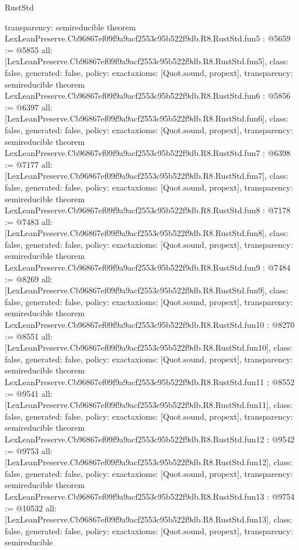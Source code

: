 \begin{lexlean}{RustStd}
\begin{coremodule}
{  transparency: semireducible
}
theorem LexLeanPreserve.Cb96867ef09f9a9acf2553c95b522f9db.R8.RustStd.fun5 : @5659 := @5855 {
  all: [LexLeanPreserve.Cb96867ef09f9a9acf2553c95b522f9db.R8.RustStd.fun5],
  class: false,
  generated: false,
  policy: exact{axioms: [Quot.sound, propext]},
  transparency: semireducible
}
theorem LexLeanPreserve.Cb96867ef09f9a9acf2553c95b522f9db.R8.RustStd.fun6 : @5856 := @6397 {
  all: [LexLeanPreserve.Cb96867ef09f9a9acf2553c95b522f9db.R8.RustStd.fun6],
  class: false,
  generated: false,
  policy: exact{axioms: [Quot.sound, propext]},
  transparency: semireducible
}
theorem LexLeanPreserve.Cb96867ef09f9a9acf2553c95b522f9db.R8.RustStd.fun7 : @6398 := @7177 {
  all: [LexLeanPreserve.Cb96867ef09f9a9acf2553c95b522f9db.R8.RustStd.fun7],
  class: false,
  generated: false,
  policy: exact{axioms: [Quot.sound, propext]},
  transparency: semireducible
}
theorem LexLeanPreserve.Cb96867ef09f9a9acf2553c95b522f9db.R8.RustStd.fun8 : @7178 := @7483 {
  all: [LexLeanPreserve.Cb96867ef09f9a9acf2553c95b522f9db.R8.RustStd.fun8],
  class: false,
  generated: false,
  policy: exact{axioms: [Quot.sound, propext]},
  transparency: semireducible
}
theorem LexLeanPreserve.Cb96867ef09f9a9acf2553c95b522f9db.R8.RustStd.fun9 : @7484 := @8269 {
  all: [LexLeanPreserve.Cb96867ef09f9a9acf2553c95b522f9db.R8.RustStd.fun9],
  class: false,
  generated: false,
  policy: exact{axioms: [Quot.sound, propext]},
  transparency: semireducible
}
theorem LexLeanPreserve.Cb96867ef09f9a9acf2553c95b522f9db.R8.RustStd.fun10 : @8270 := @8551 {
  all: [LexLeanPreserve.Cb96867ef09f9a9acf2553c95b522f9db.R8.RustStd.fun10],
  class: false,
  generated: false,
  policy: exact{axioms: [Quot.sound, propext]},
  transparency: semireducible
}
theorem LexLeanPreserve.Cb96867ef09f9a9acf2553c95b522f9db.R8.RustStd.fun11 : @8552 := @9541 {
  all: [LexLeanPreserve.Cb96867ef09f9a9acf2553c95b522f9db.R8.RustStd.fun11],
  class: false,
  generated: false,
  policy: exact{axioms: [Quot.sound, propext]},
  transparency: semireducible
}
theorem LexLeanPreserve.Cb96867ef09f9a9acf2553c95b522f9db.R8.RustStd.fun12 : @9542 := @9753 {
  all: [LexLeanPreserve.Cb96867ef09f9a9acf2553c95b522f9db.R8.RustStd.fun12],
  class: false,
  generated: false,
  policy: exact{axioms: [Quot.sound, propext]},
  transparency: semireducible
}
theorem LexLeanPreserve.Cb96867ef09f9a9acf2553c95b522f9db.R8.RustStd.fun13 : @9754 := @10532 {
  all: [LexLeanPreserve.Cb96867ef09f9a9acf2553c95b522f9db.R8.RustStd.fun13],
  class: false,
  generated: false,
  policy: exact{axioms: [Quot.sound, propext]},
  transparency: semireducible
}
\end{coremodule}
\end{lexlean}
